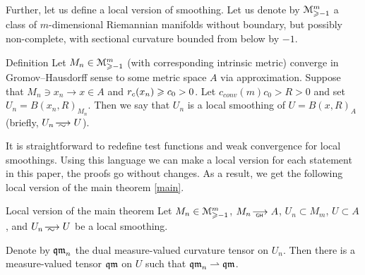 Further, let us define a local version of smoothing.
Let us denote by
$\mathcal M_{\geqslant -1}^m$ a class of $m$-dimensional Riemannian 
manifolds without boundary, but possibly non-complete, with sectional curvature bounded
from below by $-1$.

\begin{thm}{Definition}
Let 
$M_n\in\mathcal M_{\geqslant -1}^m$ (with corresponding intrinsic metric)
converge in Gromov--Hausdorff sense to some metric space $A$ via
approximation.
Suppose that $M_n\ni x_n\to x\in A$
and $r_c(x_n)\zz\ge c_0>0$. Let $c_{conv}(m)c_0 > R>0$ and set
$U_n=B(x_n,R)_{M_n}$.
Then we say that $U_n$ is a local smoothing of $U=B(x,R)_A$ (briefly, $U_n\smooths{} U$).
\end{thm}

It is straightforward to redefine test functions and weak convergence for local smoothings.
Using this language we can make a local version for each statement in this paper, the proofs go without changes.
As a result, we get the following local version of the main theorem \ref{main}.
 
\begin{thm}{Local version of the main theorem}\label{mainloc}
Let   
$M_n\in\mathcal M_{\geqslant -1}^m$,
$M_n\GHto A$, $U_n\subset M_m$,
  $U\subset A$, and $U_n\smooths{} U$ be a local smoothing.
  
Denote by $\operatorname{\mathfrak{qm}}_n$ the dual measure-valued curvature tensor on $U_n$.
Then there is a measure-valued tensor $\operatorname{\mathfrak{qm}}$ on $U$ such that $\operatorname{\mathfrak{qm}}_n\rightharpoonup \operatorname{\mathfrak{qm}}$.
\end{thm} 

